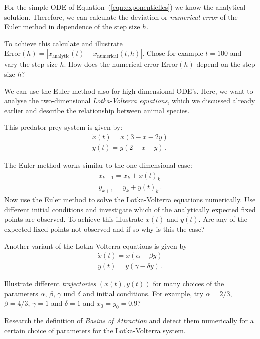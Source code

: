 \subexercise[%
  topic={Optional: Error Estimation for the Euler Method},
    ]


For the simple ODE of Equation~(\ref{eqn:exponentielles}) we know the analytical solution. Therefore, we can calculate the deviation or \emph{numerical error} of the Euler method in dependence of the step size $h$.

To achieve this calculate and illustrate $\mathrm{Error}(h)=|x_{\mathrm{analytic}}(t) - x_{\mathrm{numerical}}(t,h)|$. Chose for example $t=100$ and vary the step size $h$. How does the numerical error $\mathrm{Error}(h)$ depend on the step size $h$?

 \subexercise[%
  topic={Numerical Solution of the Lotka-Volterra Equations},
    ]

We can use the Euler method also for high dimensional ODE's. Here, we want to analyse the two-dimensional \emph{Lotka-Volterra equations}, which we discussed already earlier and describe the relationship between animal species.


This predator prey system is given by:
\begin{align}
\dot x(t) = x(3-x-2y)\\
\dot y(t) = y(2-x-y)\,.
\end{align}

The Euler method works similar to the one-dimensional case:
\begin{align}
x_{k+1} = x_{k} + \dot x(t)_{k} \\
y_{k+1} = y_{k} + \dot y(t)_{k}\,.
\end{align}
Now use the Euler method to solve the Lotka-Volterra equations numerically. Use different initial conditions and investigate which of the analytically expected fixed points are observed. To achieve this illustrate $x(t)$ and $y(t)$. Are any of the expected fixed points not observed and if so why is this the case?

\subexercise[%
  topic={Optional: Oscillations in the Lotka-Volterra System},
    ]
    
Another variant of the Lotka-Volterra equations is given by
\begin{align}
\dot x(t) = x(\alpha -\beta y)\\
\dot y(t) = y(\gamma -\delta y)\,.
\end{align}



Illustrate different \emph{trajectories} $(x(t),y(t))$ for many choices of the parameters  $\alpha$, $\beta$, $\gamma$ und $\delta$ and initial conditions. For example, try  $\alpha=2/3$, $\beta=4/3$, $\gamma=1$ and $\delta=1$ and $x_0=y_0=0.9$?

\subexercise[%
  topic={Optional: \emph{Basins of Attraction} of the Lotka-Volterra System},
    ]

Research the definition of  \emph{Basins of Attraction} and detect them numerically for a certain choice of parameters for the Lotka-Volterra system.